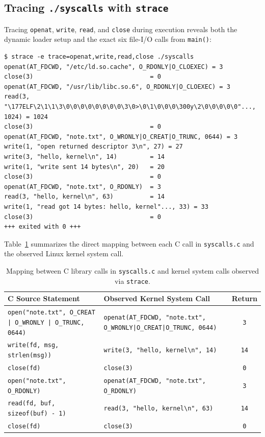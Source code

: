 \documentclass[12pt,a4paper]{article}
\begin{document}
\subsection{Tracing \texttt{./syscalls} with \texttt{strace}}
Tracing \texttt{openat}, \texttt{write}, \texttt{read}, and \texttt{close} during execution reveals both the dynamic loader setup and the exact six file-I/O calls from \texttt{main()}:
\begin{lstlisting}[style=consolestyle]
$ strace -e trace=openat,write,read,close ./syscalls
openat(AT_FDCWD, "/etc/ld.so.cache", O_RDONLY|O_CLOEXEC) = 3
close(3)                                = 0
openat(AT_FDCWD, "/usr/lib/libc.so.6", O_RDONLY|O_CLOEXEC) = 3
read(3, "\177ELF\2\1\1\3\0\0\0\0\0\0\0\0\3\0>\0\1\0\0\0\300y\2\0\0\0\0\0"..., 1024) = 1024
close(3)                                = 0
openat(AT_FDCWD, "note.txt", O_WRONLY|O_CREAT|O_TRUNC, 0644) = 3
write(1, "open returned descriptor 3\n", 27) = 27
write(3, "hello, kernel\n", 14)         = 14
write(1, "write sent 14 bytes\n", 20)   = 20
close(3)                                = 0
openat(AT_FDCWD, "note.txt", O_RDONLY)  = 3
read(3, "hello, kernel\n", 63)          = 14
write(1, "read got 14 bytes: hello, kernel"..., 33) = 33
close(3)                                = 0
+++ exited with 0 +++
\end{lstlisting}

Table~\ref{tab:syscall_map} summarizes the direct mapping between each C call in \texttt{syscalls.c} and the observed Linux kernel system call.

\begin{table}[H]
\centering
\small
\begin{tabularx}{\textwidth}{>{\raggedright\arraybackslash}p{5.5cm}>{\raggedright\arraybackslash}Xc}
\toprule
\textbf{C Source Statement} & \textbf{Observed Kernel System Call} & \textbf{Return} \\
\midrule
\texttt{open("note.txt", O\_CREAT | O\_WRONLY | O\_TRUNC, 0644)} & \texttt{openat(AT\_FDCWD, "note.txt", O\_WRONLY|O\_CREAT|O\_TRUNC, 0644)} & \texttt{3} \\
\texttt{write(fd, msg, strlen(msg))} & \texttt{write(3, "hello, kernel\textbackslash n", 14)} & \texttt{14} \\
\texttt{close(fd)} & \texttt{close(3)} & \texttt{0} \\
\texttt{open("note.txt", O\_RDONLY)} & \texttt{openat(AT\_FDCWD, "note.txt", O\_RDONLY)} & \texttt{3} \\
\texttt{read(fd, buf, sizeof(buf) - 1)} & \texttt{read(3, "hello, kernel\textbackslash n", 63)} & \texttt{14} \\
\texttt{close(fd)} & \texttt{close(3)} & \texttt{0} \\
\bottomrule
\end{tabularx}
\caption{Mapping between C library calls in \texttt{syscalls.c} and kernel system calls observed via \texttt{strace}.}
\label{tab:syscall_map}
\end{table}
\end{document}
